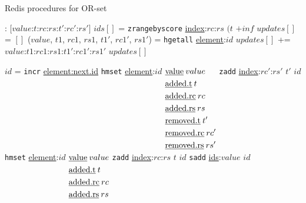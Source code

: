 \begin{algorithm}[h!]
  \small
  \caption{Redis procedures for OR-set}
  \begin{algorithmic}[0]
     : $[$$value$:$t$:$rc$:$rs$:$t'$:$rc'$:$rs'$$]$
      \State $ids[]$ = \texttt{zrangebyscore} \underline{index}:$rc$:$rs$ $(t$ $+inf$
      \State $updates[]$ = $[]$
        \State ($value$, $t1$, $rc1$, $rs1$, $t1'$, $rc1'$, $rs1'$) = \texttt{hgetall} \underline{element}:$id$
        \State $updates[]$ += $value$:$t1$:$rc1$:$rs1$:$t1'$:$rc1'$:$rs1'$
      \EndFor
      \Return $updates[]$
    \EndProcedure
    
      \State $id$ = \texttt{incr} \underline{element:next.id}
        \State \texttt{hmset} \underline{element}:$id$ $\begin{aligned}[t]
                                                         & \text{\underline{value}}\:value \\
                                                         & \text{\underline{added.t}}\:t \\
                                                         & \text{\underline{added.rc}}\:rc \\
                                                         & \text{\underline{added.rs}}\:rs \\
                                                         & \text{\underline{removed.t}}\:t' \\
                                                         & \text{\underline{removed.rc}}\:rc' \\
                                                         & \text{\underline{removed.rs}}\:rs'
                                                       \end{aligned}$
        \State \texttt{zadd} \underline{index}:$rc'$:$rs'$ $t'$ $id$
      \Else
        \State \texttt{hmset} \underline{element}:$id$ $\begin{aligned}[t]
                                                         & \text{\underline{value}}\:value \\
                                                         & \text{\underline{added.t}}\:t \\
                                                         & \text{\underline{added.rc}}\:rc \\
                                                         & \text{\underline{added.rs}}\:rs
                                                       \end{aligned}$
        \State \texttt{zadd} \underline{index}:$rc$:$rs$ $t$ $id$
      \EndIf
      \State \texttt{sadd} \underline{ids}:$value$ $id$
    \EndProcedure
  \end{algorithmic}
\end{algorithm}

